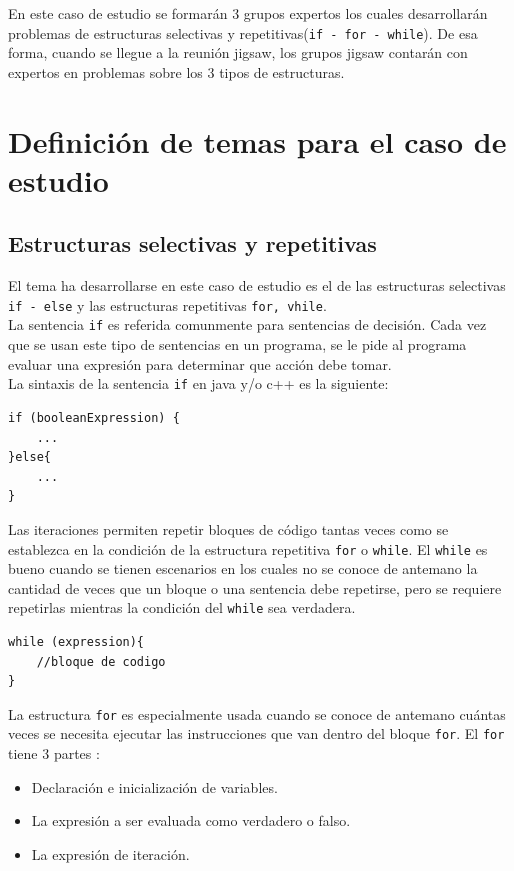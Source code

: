 En este caso de estudio se formarán 3 grupos expertos los cuales desarrollarán problemas de estructuras selectivas y repetitivas(\texttt{if - for - while}). De esa forma, cuando se llegue a la reunión jigsaw, los grupos jigsaw contarán con expertos en problemas sobre los 3 tipos de estructuras.

\section{Definición de temas para el caso de estudio}
\subsection{Estructuras selectivas y repetitivas}
El tema ha desarrollarse en este caso de estudio es el de las estructuras selectivas \texttt{if - else} y las estructuras repetitivas \texttt{for, vhile}.\\

La sentencia \texttt{if} es referida comunmente para sentencias de decisión. Cada vez que se usan este tipo de sentencias en un programa, se le pide al programa evaluar una expresión para determinar que acción debe tomar.\\

La sintaxis de la sentencia \texttt{if} en java y/o c++ es la siguiente:\\

\begin{lstlisting}
if (booleanExpression) {
	...
}else{
	...
}
\end{lstlisting}


Las iteraciones permiten repetir bloques de código tantas veces como se establezca en la condición de la estructura repetitiva \texttt{for} o \texttt{while}. El \texttt{while} es bueno cuando se tienen escenarios en los cuales no se conoce de antemano la cantidad de veces que un bloque o una sentencia debe repetirse, pero se requiere repetirlas mientras la condición del \texttt{while} sea verdadera.\\

\begin{lstlisting}
while (expression){
	//bloque de codigo
}
\end{lstlisting}

La estructura \texttt{for} es especialmente usada cuando se conoce de antemano cuántas veces se necesita ejecutar las instrucciones que van dentro del bloque \texttt{for}. El \texttt{for} tiene 3 partes :

\begin{itemize}
	\item Declaración e inicialización de variables.
	\item La expresión a ser evaluada como verdadero o falso.
	\item La expresión de iteración.
\end{itemize}

